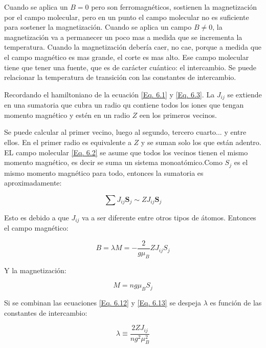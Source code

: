 \documentclass[11pt,fleqn]{book}
\renewcommand{\vec}[1]{\mathbf{#1}}
\begin{document}

Cuando se aplica un $B=0$ pero son ferromagnéticos, sostienen la magnetización por el campo molecular, pero en un punto el campo molecular no es suficiente para sostener la magnetización. Cuando se aplica un campo $B\neq0$, la magnetización va a permanecer un poco mas a medida que se incrementa la temperatura. Cuando la magnetización debería caer, no cae, porque a medida que el campo magnético es mas grande, el corte es mas alto. Ese campo molecular tiene que tener una fuente, que es de carácter cuántico: el intercambio. Se puede relacionar la temperatura de transición con las constantes de intercambio.

Recordando el hamiltoniano de la ecuación \ref{Eq. 6.1} y \ref{Eq. 6.3}. La $J_{ij}$ se extiende en una sumatoria que cubra un radio qu contiene todos los iones que tengan momento magnético y estén en un radio $Z$ een los primeros vecinos. 


Se puede calcular al primer vecino, luego al segundo, tercero cuarto... y entre ellos. En el primer radio es equivalente a $Z$ y se suman solo los que están adentro. EL campo molecular \ref{Eq. 6.2} se asume que todos los vecinos tienen el mismo momento magnético, es decir se suma un sistema monoatómico.Como $S_{j}$ es el mismo momento magnético para todo, entonces la sumatoria es aproximadamente:

\begin{equation*}
    \sum J_{ij}\vec{S}_{j}\sim ZJ_{ij}\vec{S}_{j}
\end{equation*}

Esto es debido a que $J_{ij}$ va a ser diferente entre otros tipos de átomos. Entonces el campo magnético:

\begin{equation}
        B=\lambda M=-\frac{2}{g\mu_{B}}ZJ_{ij}S_{j}
    \label{Eq. 6.12}
\end{equation}

Y la magnetización:

\begin{equation}
        M=ng\mu_{B}S_{j}
    \label{Eq. 6.13}
\end{equation}

Si se combinan las ecuaciones \ref{Eq. 6.12} y \ref{Eq. 6.13} se despeja $\lambda$ es función de las constantes de intercambio:

\begin{equation}
        \lambda\equiv\frac{2ZJ_{ij}}{ng^{2}\mu_{B}^{2}}
    \label{Eq. 6.14}
\end{equation}      
\end{document}
